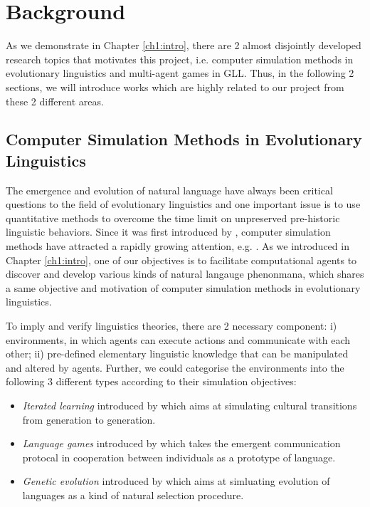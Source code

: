 \documentclass[msc,deptreport]{infthesis} %
\begin{document}

\chapter{Background}
\label{ch2:background}

As we demonstrate in Chapter \ref{ch1:intro}, there are 2 almost disjointly developed research topics that motivates this project, i.e. computer simulation methods in evolutionary linguistics and multi-agent games in GLL. Thus, in the following 2 sections, we will introduce works which are highly related to our project from these 2 different areas.

\section{Computer Simulation Methods in Evolutionary Linguistics}
\label{sec2.1:evolang}

The emergence and evolution of natural language have always been critical questions to the field of evolutionary linguistics \cite{macwhinney2013emergence} and one important issue is to use quantitative methods to overcome the time limit on unpreserved pre-historic linguistic behaviors\cite{lieberman2006toward, evans2009myth}. Since it was first introduced by \cite{hurford1989biological}, computer simulation methods have attracted a rapidly growing attention, e.g. \cite{hurford1998approaches, knight2000evolutionary, briscoe2002book, christiansen2003language, bickerton2009biological, cangelosi2012simulating}. As we introduced in Chapter \ref{ch1:intro}, one of our objectives is to facilitate computational agents to discover and develop various kinds of natural langauge phenonmana, which shares a same objective and motivation of computer simulation methods in evolutionary linguistics.

To imply and verify linguistics theories, there are 2 necessary component: i) environments, in which agents can execute actions and communicate with each other; ii) pre-defined elementary linguistic knowledge that can be manipulated and altered by agents. Further, we could categorise the environments into the following 3 different types according to their simulation objectives:
\begin{itemize}
  \item \textit{Iterated learning} introduced by \cite{kirby1999function} which aims at simulating cultural transitions from generation to generation.
  \item \textit{Language games} introduced by \cite{wittgenstein2009philosophical} which takes the emergent communication protocal in cooperation between individuals as a prototype of language.
  \item \textit{Genetic evolution} introduced by \cite{briscoe1998language} which aims at simluating evolution of languages as a kind of natural selection procedure\cite{darwin1859origin}.
\end{itemize}
\end{document}

